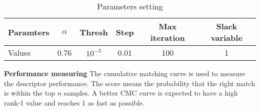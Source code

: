 \begin{table}[H]
\centering
\caption{Parameters setting}
\begin{tabular}{|l|c|c|c|c|c|}
\hline
Paramters &$\alpha$&Thresh&Step&Max iteration& Slack variable\\
\hline
Values &0.76&$10^{-5}$&0.01&100&1\\
\hline
\end{tabular}
\end{table}


\textbf{Performance measuring} The cumulative matching curve is used to measure the descriptor performance. The score means the probability that the right match is within the top $n$ samples. A better CMC curve is expected to have a high rank-1 value and reaches 1 as fast as possible.


